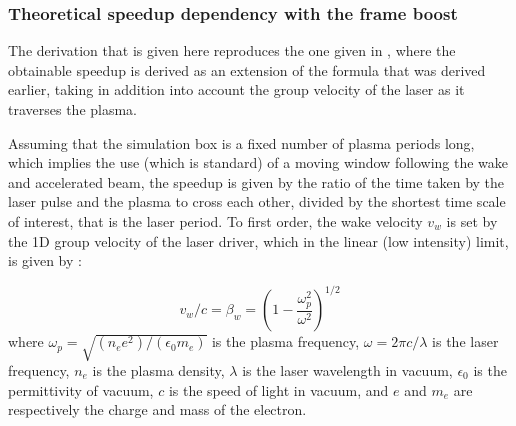 \documentclass[]{report}
\begin{document}
\subsubsection{Theoretical speedup dependency with the frame boost}
The derivation that is given here reproduces the one given in \cite{VayPOP2011}, where the obtainable speedup is derived as an extension of the formula that was derived earlier\cite{VayPRL07}, taking in addition into account the group velocity of the laser as it traverses the plasma.  

Assuming that the simulation box is a fixed number of plasma periods long, which implies the use (which is standard) of a moving window following 
the wake and accelerated beam, the speedup is given by the ratio of the time taken by the laser pulse and the plasma to cross each other, divided by the shortest time scale of interest, that is the laser period. To first order, the wake velocity $v_w$ is set by the 1D group velocity of the laser driver, which in the linear (low intensity) limit, is given by \cite{EsareyRMP09}:

%
\begin{equation}
v_w/c=\beta_w=\left(1-\frac{\omega_p^2}{\omega^2}\right)^{1/2}
\end{equation}
%
where $\omega_p=\sqrt{(n_e e^2)/(\epsilon_0 m_e)}$ is the plasma frequency, $\omega=2\pi c/\lambda$ is the laser frequency, $n_e$ is the plasma density, $\lambda$ is the laser wavelength in vacuum, $\epsilon_0$ is the permittivity of vacuum, $c$ is the speed of light in vacuum, and $e$ and $m_e$ are respectively the charge and mass of the electron.
\end{document}
